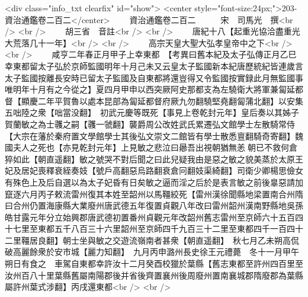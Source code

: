 <div class="info_txt clearfix" id="show">
<center style="font-size:24px;">203-資治通鑑卷二百二</center>
  　　資治通鑑卷二百二　　　宋　司馬光　撰<br />
<br />
　　胡三省　音註<br />
<br />
　　唐紀十八【起重光協洽盡重光大荒落几十一年】<br />
<br />
　　高宗天皇大聖大弘孝皇帝中之下<br />
<br />
　　咸亨二年春正月甲子上幸東都　【考異曰舊本紀及太子弘傳正月乙巳幸東都留太子弘於京師監國明年十月己未又云皇太子監國新本紀唐歷統紀皆連歲言太子監國按離長安時已留太子監國及自東都將還豈得又令監國按實録此月無監國事唯明年十月有之今從之】夏四月甲申以西突厥阿史那都支為左驍衛大將軍兼匐延都督【顯慶二年平賀魯以處本昆部為匐延都督府厥九勿翻驍堅堯翻匐蒲北翻】以安集五咄陸之衆【咄當没翻】　初武元慶等既死【事見上卷乾封元年】皇后奏以其姊子賀蘭敏之為士彠之嗣【彠一虢翻】襲爵周公改姓武氏累遷弘文館學士左散騎常侍【大宗在藩於秦府置文學館學士其後弘文崇文二館皆有學士散悉亶翻騎奇寄翻】魏國夫人之死也【亦見乾封元年】上見敏之悲泣曰曏吾出視朝猶無恙朝已不救何倉猝如此【朝直遥翻】敏之號哭不對后聞之曰此兒疑我由是惡之敏之貌美蒸於太原王妃及居妃喪釋衰絰奏妓【號戶高翻惡烏路翻衰倉冋翻妓渠綺翻】司衛少卿楊思儉女有殊色上及后自選以為太子妃昏有日矣敏之逼而淫之后於是表言敏之前後辠惡請加竄逐六月丙子敕流雷州復其本姓至韶州以馬韁絞死【雷州漢徐聞縣地梁置南合州隋曰合州仍置海康縣大業廢州唐武德五年復置貞觀八年改曰雷州韶州漢南野縣地吳孫皓甘露元年分立始興郡唐武德初置番州貞觀元年改韶州舊志雷州至京師六十五百四十七里至東都五千八百三十六里韶州至京師四千九百三十二里至東都四千一百四十二里韁居良翻】朝士坐與敏之交遊流嶺南者甚衆【朝直遥翻】　秋七月乙未朔高侃破高麗餘衆於安市城【麗力知翻】　九月丙申潞州長史徐王元禮薨　冬十一月甲午朔日有食之　車駕自東都幸許汝十二月癸酉校獵於葉縣【舊志東都至許州四百里至汝州百八十里葉縣舊屬南陽郡後并省後齊置襄州後周廢州置南襄城郡隋廢郡為葉縣屬許州葉式涉翻】丙戌還東都<br />
<br />
